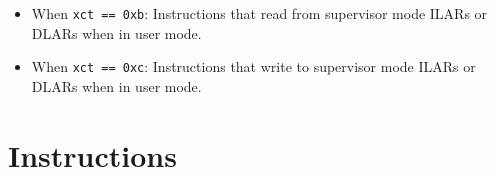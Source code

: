 \documentclass{article}
\begin{document}
\begin{itemize}

	\item When \texttt{xct == 0xb}:
		Instructions that read from supervisor mode ILARs or DLARs when in
		user mode.
	\item When \texttt{xct == 0xc}:
		Instructions that write to supervisor mode ILARs or DLARs when in
		user mode.
	\end{itemize}
	\newpage
\section{Instructions}
\end{document}
